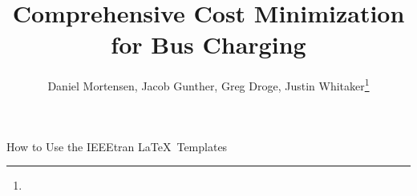 \documentclass[lettersize,journal]{IEEEtran}
\begin{document}
\title{Comprehensive Cost Minimization for Bus Charging}
\author{Daniel Mortensen, Jacob Gunther, Greg Droge, Justin Whitaker\thanks{}}

%
{How to Use the IEEEtran \LaTeX \ Templates}

\maketitle 









\newpage
\printbibliography
\end{document}
